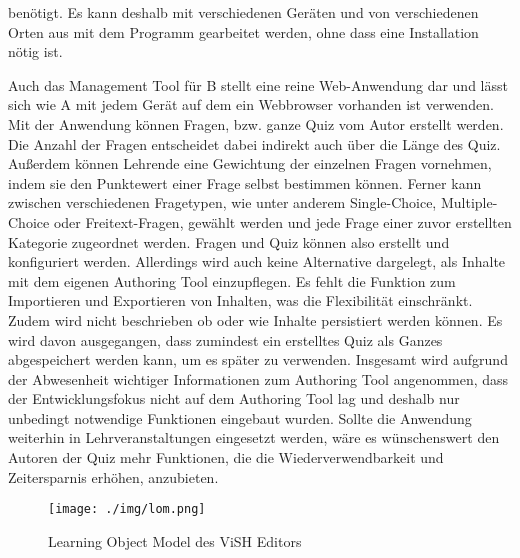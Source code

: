 \documentclass[conference]{IEEEtran}
\begin{document}
benötigt. Es kann deshalb mit verschiedenen Geräten und von verschiedenen Orten aus mit dem Programm gearbeitet werden, ohne dass eine Installation nötig ist.

Auch das Management Tool für B stellt eine reine Web-Anwendung dar und lässt sich wie A mit jedem Gerät auf dem ein Webbrowser vorhanden ist verwenden. Mit der Anwendung können Fragen, bzw. ganze Quiz vom Autor erstellt werden. Die Anzahl der Fragen entscheidet dabei indirekt auch über die Länge des Quiz. Außerdem können Lehrende eine Gewichtung der einzelnen Fragen vornehmen, indem sie den Punktewert einer Frage selbst bestimmen können. Ferner kann zwischen verschiedenen Fragetypen, wie unter anderem Single-Choice, Multiple-Choice oder Freitext-Fragen, gewählt werden und jede Frage einer zuvor erstellten Kategorie zugeordnet werden. Fragen und Quiz können also erstellt und konfiguriert werden. Allerdings wird auch keine Alternative dargelegt, als Inhalte mit dem eigenen Authoring Tool einzupflegen. Es fehlt die Funktion zum Importieren und Exportieren von Inhalten, was die Flexibilität einschränkt. Zudem wird nicht beschrieben ob oder wie Inhalte persistiert werden können. Es wird davon ausgegangen, dass zumindest ein erstelltes Quiz als Ganzes abgespeichert werden kann, um es später zu verwenden. Insgesamt wird aufgrund der Abwesenheit wichtiger Informationen zum Authoring Tool angenommen, dass der Entwicklungsfokus nicht auf dem Authoring Tool lag und deshalb nur unbedingt notwendige Funktionen eingebaut wurden. Sollte die Anwendung weiterhin in Lehrveranstaltungen eingesetzt werden, wäre es wünschenswert den Autoren der Quiz mehr Funktionen, die die Wiederverwendbarkeit und Zeitersparnis erhöhen, anzubieten.

\begin{figure}[htbp]
\centerline{\texttt{[image: ./img/lom.png]}}
\caption{Learning Object Model des ViSH Editors \cite[S. 3]{Gordillo2015}}
\label{lom}
\end{figure}
\end{document}
